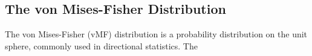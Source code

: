 \subsection{The von Mises-Fisher Distribution}

The von Mises-Fisher (vMF) distribution is a probability distribution on the unit sphere, commonly used in directional statistics. The 